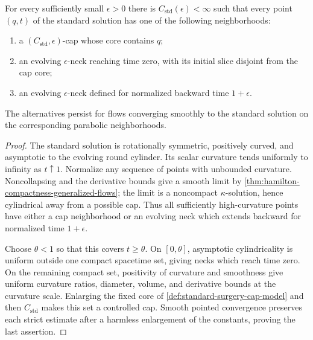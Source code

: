 \begin{theorem}
\label{thm:standard-solution-canonical-neighborhoods}
\notready
For every sufficiently small $\epsilon>0$ there is
$C_{\mathrm{std}}(\epsilon)<\infty$ such that every point $(q,t)$ of the
standard solution has one of the following neighborhoods:
\begin{enumerate}
\item a $(C_{\mathrm{std}},\epsilon)$-cap whose core contains $q$;
\item an evolving $\epsilon$-neck reaching time zero, with its initial slice
      disjoint from the cap core;
\item an evolving $\epsilon$-neck defined for normalized backward time
      $1+\epsilon$.
\end{enumerate}
The alternatives persist for flows converging smoothly to the standard
solution on the corresponding parabolic neighborhoods.
\end{theorem}

\begin{proof}
The standard solution is rotationally symmetric, positively curved, and
asymptotic to the evolving round cylinder.  Its scalar curvature tends
uniformly to infinity as $t\uparrow1$.  Normalize any sequence of points with
unbounded curvature.  Noncollapsing and the derivative bounds give a smooth
limit by \ref{thm:hamilton-compactness-generalized-flows}; the limit is a
noncompact $\kappa$-solution, hence cylindrical away from a possible cap.
Thus all sufficiently high-curvature points have either a cap neighborhood
or an evolving neck which extends backward for normalized time
$1+\epsilon$.

Choose $\theta<1$ so that this covers $t\ge\theta$.  On
$[0,\theta]$, asymptotic cylindricality is uniform outside one compact
spacetime set, giving necks which reach time zero.  On the remaining compact
set, positivity of curvature and smoothness give uniform curvature ratios,
diameter, volume, and derivative bounds at the curvature scale.  Enlarging
the fixed core of \ref{def:standard-surgery-cap-model} and then
$C_{\mathrm{std}}$
makes this set a controlled cap.  Smooth pointed convergence preserves each
strict estimate after a harmless enlargement of the constants, proving the
last assertion.
\end{proof}

